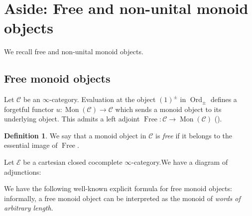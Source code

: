 \documentclass[12pt, reqno]{amsart}
\theoremstyle{plain}
\theoremstyle{definition}
\newtheorem{definition}[theorem]{Definition}
\begin{document}
\section{Aside: Free and non-unital monoid objects}\label{Free monoid objects}

We recall free and non-unital monoid objects.

\subsection{Free monoid objects}

Let $\mathcal{C}$ be an $\infty$-category. Evaluation at the object $(1)^\pm$ in $\operatorname{Ord}_\pm$ defines a forgetful functor $u\colon \operatorname{Mon}(\mathcal{C})\rightarrow \mathcal{C}$ which sends a monoid object to its underlying object. This admits a left adjoint $\operatorname{Free}\colon \mathcal{C}\rightarrow \operatorname{Mon}(\mathcal{C})$ (\cite[Example 3.1.3.6]{LurieHA}).

\begin{definition}
We say that a monoid object in $\mathcal{C}$ is \textit{free} if it belongs to the essential image of $\operatorname{Free}$.
\end{definition}

Let $\mathcal{E}$ be a cartesian closed cocomplete $\infty$-category.We have a diagram of adjunctions:

\begin{center}
\end{center}

We have the following well-known explicit formula for free monoid objects: informally, a free monoid object can be interpreted as the monoid of \textit{words of arbitrary length}.
\end{document}
